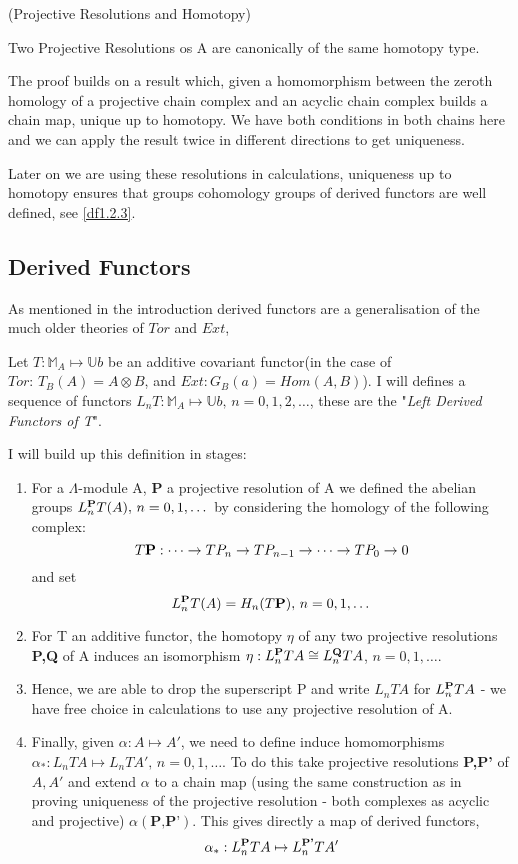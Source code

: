 \begin{proposition}(Projective Resolutions and Homotopy\label{df1.3.3})

Two Projective Resolutions os A are canonically of the same
homotopy type.
\end{proposition}

The proof builds on a result which, given a homomorphism between
the zeroth homology of a projective chain complex and an acyclic
chain complex builds a chain map, unique up to homotopy. We have
both conditions in both chains here and we can apply the result
twice in different directions to get uniqueness.

Later on we are using these resolutions in calculations,
uniqueness up to homotopy ensures that groups cohomology groups of
derived functors are well defined, see \ref{df1.2.3}.


\subsection{Derived Functors}\label{df1.4}
As mentioned in the introduction derived functors are a
generalisation of the much older theories of $Tor$ and $Ext$,

Let $T:\mathbb M_A \mapsto \mathbb U b$ be an additive covariant
functor(in the case of $Tor:\,T_B(A) = A\otimes B$, and
$Ext:G_B(a) = Hom(A,B)$). I will defines a sequence of functors
$L_nT:\mathbb M_A\mapsto \mathbb U b,\,n=0,1,2,\dots$, these are
the "\textit{Left Derived Functors of T}".

I will build up this definition in stages:
\begin{enumerate}
    \item For a $\Lambda$-module A, \textbf P a projective
    resolution of A we defined the abelian groups $L^\textbf P_n
    T(A),\, n=0,1,\dots$ by considering the homology of the following complex:
    $$T\textbf P : \dots \rightarrow TP_n\rightarrow TP_{n-1}
    \rightarrow \dots \rightarrow TP_0\rightarrow 0$$
    and set
    $$L_n^\textbf P T(A) = H_n(T \textbf P),\, n=0,1,\dots$$

    \item For T an additive functor, the homotopy $\eta$ of any two
    projective resolutions \textbf{P,Q} of A induces an isomorphism
    $\eta: L_n^\textbf P TA\cong L_n^\textbf Q TA$,
    $n=0,1,\dots$.
    \item Hence, we are able to drop the superscript P and write
    $L_nTA$ for $L_n^\textbf P TA$ - we have free choice in
    calculations to use any projective resolution of A.

    \item   Finally, given $\alpha:A\mapsto A'$, we need to define
    induce homomorphisms $\alpha_*:L_nTA\mapsto L_nTA',\,
    n=0,1,\dots$. To do this take projective resolutions
    \textbf{P,P'} of $A,A'$ and extend $\alpha$ to a chain map
    (using the same construction as in proving uniqueness of the
    projective resolution - both complexes as acyclic and
    projective) $\alpha(\textbf{P,P'})$. This gives directly a map
    of derived functors, $$\alpha_*:L_n^\textbf P TA \mapsto
    L_n^\textbf {P'} TA'$$
\end{enumerate}

